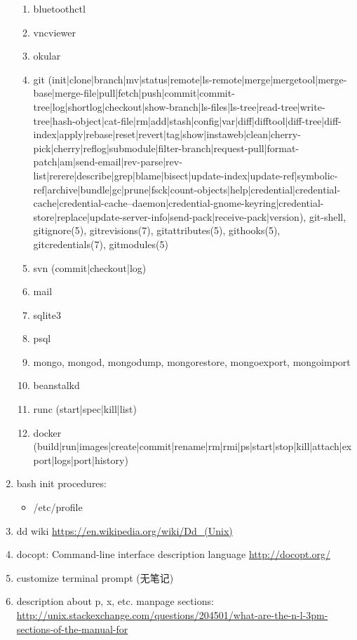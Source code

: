 \documentclass{article}
\begin{document}
\begin{enumerate}
\begin{enumerate}
            \item bluetoothctl
            \item vncviewer
            \item okular
            \item git (init|clone|branch|mv|status|remote|ls-remote|merge|mergetool|merge-base|merge-file|pull|fetch|push|commit|commit-tree|log|shortlog|checkout|show-branch|ls-files|ls-tree|read-tree|write-tree|hash-object|cat-file|rm|add|stash|config|var|diff|difftool|diff-tree|diff-index|apply|rebase|reset|revert|tag|show|instaweb|clean|cherry-pick|cherry|reflog|submodule|filter-branch|request-pull|format-patch|am|send-email|rev-parse|rev-list|rerere|describe|grep|blame|bisect|update-index|update-ref|symbolic-ref|archive|bundle|gc|prune|fsck|count-objects|help|credential|credential-cache|credential-cache--daemon|credential-gnome-keyring|credential-store|replace|update-server-info|send-pack|receive-pack|version), git-shell, gitignore(5), gitrevisions(7), gitattributes(5), githooks(5), gitcredentials(7), gitmodules(5)
            \item svn (commit|checkout|log)
            \item mail
            \item sqlite3
            \item psql
            \item mongo, mongod, mongodump, mongorestore, mongoexport, mongoimport
            \item beanstalkd
            \item runc (start|spec|kill|list)
            \item docker (build|run|images|create|commit|rename|rm|rmi|ps|start|stop|kill|attach|export|logs|port|history)
        \end{enumerate}
    \item bash init procedures:
        \begin{itemize}
            \item /etc/profile
        \end{itemize}
    \item dd wiki \url{https://en.wikipedia.org/wiki/Dd_(Unix)}
    \item docopt: Command-line interface description language \url{http://docopt.org/}
    \item customize terminal prompt (无笔记)
    \item description about p, x, etc. manpage sections: \url{http://unix.stackexchange.com/questions/204501/what-are-the-n-l-3pm-sections-of-the-manual-for}

\end{enumerate}
\end{document}
